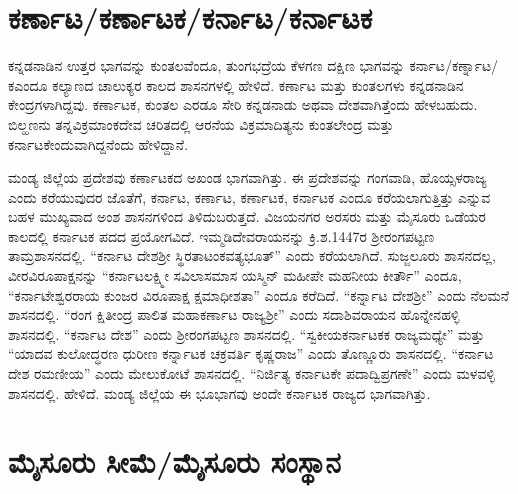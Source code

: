 \section*{ಕರ್ಣಾಟ/ಕರ್ಣಾಟಕ/ಕರ್ನಾಟ/ಕರ್ನಾಟಕ}

ಕನ್ನಡನಾಡಿನ ಉತ್ತರ ಭಾಗವನ್ನು ಕುಂತಲವೆಂದೂ, ತುಂಗಭದ್ರೆಯ ಕೆಳಗಣ ದಕ್ಷಿಣ ಭಾಗವನ್ನು ಕರ್ನಾಟ/ಕರ್ಣ್ನಾಟ/ಕ\break ಎಂದೂ ಕಲ್ಯಾಣದ ಚಾಲುಕ್ಯರ ಕಾಲದ ಶಾಸನಗಳಲ್ಲಿ ಹೇಳಿದೆ. ಕರ್ಣಾಟ ಮತ್ತು ಕುಂತಲಗಳು ಕನ್ನಡನಾಡಿನ ಕೇಂದ್ರಗಳಾ\-ಗಿದ್ದವು. ಕರ್ಣಾಟಕ, ಕುಂತಲ ಎರಡೂ ಸೇರಿ ಕನ್ನಡನಾಡು ಅಥವಾ ದೇಶವಾಗಿತ್ತೆಂದು ಹೇಳಬಹುದು. ಬಿಲ್ಹಣನು ತನ್ನ\break ವಿಕ್ರಮಾಂಕದೇವ ಚರಿತದಲ್ಲಿ ಆರನೆಯ ವಿಕ್ರಮಾದಿತ್ಯನು ಕುಂತಲೇಂದ್ರ ಮತ್ತು ಕರ್ನಾಟಕೇಂದುವಾಗಿದ್ದನೆಂದು ಹೇಳಿದ್ದಾನೆ.

ಮಂಡ್ಯ ಜಿಲ್ಲೆಯ ಪ್ರದೇಶವು ಕರ್ಣಾಟಕದ ಅಖಂಡ ಭಾಗವಾಗಿತ್ತು. ಈ ಪ್ರದೇಶವನ್ನು ಗಂಗವಾಡಿ, ಹೊಯ್ಸಳರಾಜ್ಯ ಎಂದು ಕರೆಯುವುದರ ಜೊತೆಗೆ, ಕರ್ನಾಟ, ಕರ್ಣಾಟ, ಕರ್ಣಾಟಕ, ಕರ್ನಾಟಕ ಎಂದೂ ಕರೆಯಲಾಗುತ್ತಿತ್ತು ಎನ್ನುವ ಬಹಳ ಮುಖ್ಯವಾದ ಅಂಶ ಶಾಸನಗಳಿಂದ ತಿಳಿದುಬರುತ್ತದೆ. ವಿಜಯನಗರ ಅರಸರು ಮತ್ತು ಮೈಸೂರು ಒಡೆಯರ ಕಾಲದಲ್ಲಿ ಕರ್ನಾಟಕ ಪದದ ಪ್ರಯೋಗವಿದೆ. ಇಮ್ಮಡಿದೇವರಾಯನನ್ನು ಕ್ರಿ.ಶ.1447ರ ಶ‍್ರೀರಂಗಪಟ್ಟಣ ತಾಮ್ರಶಾಸನದಲ್ಲಿ. “ಕರ್ನಾಟ ದೇಶಶ‍್ರೀ ಸ್ಥಿರತಾಟಂಕವತ್ಯಭೂತ್​” ಎಂದು ಕರೆಯಲಾಗಿದೆ. ಸುಜ್ಜಲೂರು ಶಾಸನದಲ್ಲ, ವೀರವಿರೂಪಾಕ್ಷನನ್ನು “ಕರ್ನಾಟಲಕ್ಷ್ಮೀ ಸವಿಲಾಸಮಾಸ ಯಸ್ಮಿನ್​ ಮಹೀಪೇ ಮಹನೀಯ ಕೀರ್ತೌ” ಎಂದೂ, “ಕರ್ನಾಟೇಶ್ವರರಾಯ ಕುಂಜರ ವಿರೂಪಾಕ್ಷ ಕ್ಷಮಾಧೀಶತಾ” ಎಂದೂ ಕರೆದಿದೆ. “ಕರ್ನ್ನಾಟ ದೇಶಶ‍್ರೀ” ಎಂದು ನೆಲಮನೆ ಶಾಸನದಲ್ಲಿ. “ರಂಗ ಕ್ಷಿತೀಂದ್ರ ಪಾಲಿತ ಮಹಾಕರ್ಣಾಟ ರಾಜ್ಯಶ‍್ರೀ” ಎಂದು ಸದಾಶಿವರಾಯನ ಹೊನ್ನೇನಹಳ್ಳಿ ಶಾಸನದಲ್ಲಿ. “ಕರ್ನಾಟ ದೇಶ” ಎಂದು ಶ‍್ರೀರಂಗಪಟ್ಟಣ ಶಾಸನದಲ್ಲಿ. “ಸ್ವಕೀಯಕರ್ನಾಟಕಕ ರಾಜ್ಯಮಧ್ಯೇ” ಮತ್ತು “ಯಾದವ ಕುಲೋದ್ಧರಣ ಧುರೀಣ ಕರ್ನ್ನಾಟಕ ಚಕ್ರವರ್ತಿ ಕೃಷ್ಣರಾಜ” ಎಂದು ತೊಣ್ಣೂರು ಶಾಸನದಲ್ಲಿ. “ಕರ್ನಾಟ ದೇಶ ರಮಣೀಯ” ಎಂದು ಮೇಲುಕೋಟೆ ಶಾಸನದಲ್ಲಿ. “ನಿರ್ಜಿತ್ಯ ಕರ್ನಾಟಕೇ ಪದಾದ್ವಿಪ್ರಗಣೇ” ಎಂದು ಮಳವಳ್ಳಿ ಶಾಸನದಲ್ಲಿ. ಹೇಳಿದೆ. ಮಂಡ್ಯ ಜಿಲ್ಲೆಯ ಈ ಭೂಭಾಗವು ಅಂದೇ ಕರ್ನಾಟಕ ರಾಜ್ಯದ ಭಾಗವಾಗಿತ್ತು.

\section*{ಮೈಸೂರು ಸೀಮೆ/ಮೈಸೂರು ಸಂಸ್ಥಾನ}

